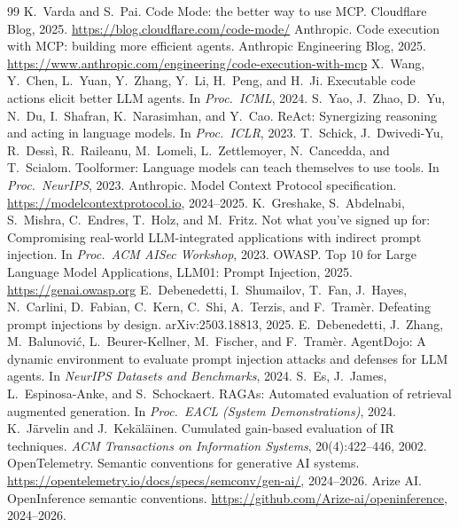 \documentclass[11pt]{article}
\begin{document}
\begin{thebibliography}{99}
 K.~Varda and S.~Pai. Code Mode: the better way to use MCP. Cloudflare Blog, 2025. \url{https://blog.cloudflare.com/code-mode/}
 Anthropic. Code execution with MCP: building more efficient agents. Anthropic Engineering Blog, 2025. \url{https://www.anthropic.com/engineering/code-execution-with-mcp}
 X.~Wang, Y.~Chen, L.~Yuan, Y.~Zhang, Y.~Li, H.~Peng, and H.~Ji. Executable code actions elicit better LLM agents. In \emph{Proc.\ ICML}, 2024.
 S.~Yao, J.~Zhao, D.~Yu, N.~Du, I.~Shafran, K.~Narasimhan, and Y.~Cao. ReAct: Synergizing reasoning and acting in language models. In \emph{Proc.\ ICLR}, 2023.
 T.~Schick, J.~Dwivedi-Yu, R.~Dess\`{i}, R.~Raileanu, M.~Lomeli, L.~Zettlemoyer, N.~Cancedda, and T.~Scialom. Toolformer: Language models can teach themselves to use tools. In \emph{Proc.\ NeurIPS}, 2023.
 Anthropic. Model Context Protocol specification. \url{https://modelcontextprotocol.io}, 2024--2025.
 K.~Greshake, S.~Abdelnabi, S.~Mishra, C.~Endres, T.~Holz, and M.~Fritz. Not what you've signed up for: Compromising real-world LLM-integrated applications with indirect prompt injection. In \emph{Proc.\ ACM AISec Workshop}, 2023.
 OWASP. Top 10 for Large Language Model Applications, LLM01: Prompt Injection, 2025. \url{https://genai.owasp.org}
 E.~Debenedetti, I.~Shumailov, T.~Fan, J.~Hayes, N.~Carlini, D.~Fabian, C.~Kern, C.~Shi, A.~Terzis, and F.~Tram\`{e}r. Defeating prompt injections by design. arXiv:2503.18813, 2025.
 E.~Debenedetti, J.~Zhang, M.~Balunovi\'{c}, L.~Beurer-Kellner, M.~Fischer, and F.~Tram\`{e}r. AgentDojo: A dynamic environment to evaluate prompt injection attacks and defenses for LLM agents. In \emph{NeurIPS Datasets and Benchmarks}, 2024.
 S.~Es, J.~James, L.~Espinosa-Anke, and S.~Schockaert. RAGAs: Automated evaluation of retrieval augmented generation. In \emph{Proc.\ EACL (System Demonstrations)}, 2024.
 K.~J\"{a}rvelin and J.~Kek\"{a}l\"{a}inen. Cumulated gain-based evaluation of IR techniques. \emph{ACM Transactions on Information Systems}, 20(4):422--446, 2002.
 OpenTelemetry. Semantic conventions for generative AI systems. \url{https://opentelemetry.io/docs/specs/semconv/gen-ai/}, 2024--2026.
 Arize AI. OpenInference semantic conventions. \url{https://github.com/Arize-ai/openinference}, 2024--2026.
\end{thebibliography}
\end{document}

